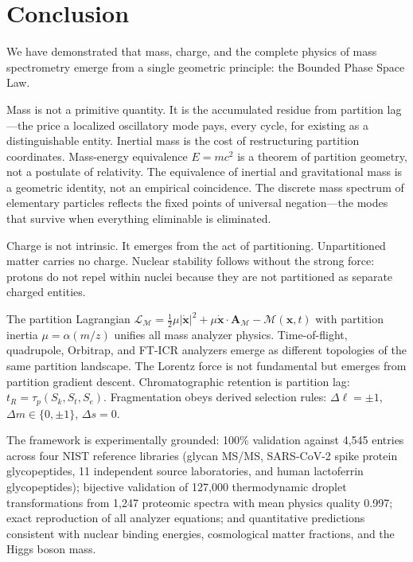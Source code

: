 \documentclass[twocolumn,10pt,a4paper]{article}
\theoremstyle{definition}
\theoremstyle{remark}
\newcommand{\Depth}{\mathcal{M}}
\newcommand{\Lagr}{\mathcal{L}}
\newcommand{\Apartition}{\mathbf{A}_{\mathcal{M}}}
\newcommand{\partinert}{\mu}
\newcommand{\taup}{\tau_p}
\begin{document}
\section{Conclusion}
\label{sec:conclusion}

We have demonstrated that mass, charge, and the complete physics of mass spectrometry emerge from a single geometric principle: the Bounded Phase Space Law.

Mass is not a primitive quantity. It is the accumulated residue from partition lag---the price a localized oscillatory mode pays, every cycle, for existing as a distinguishable entity. Inertial mass is the cost of restructuring partition coordinates. Mass-energy equivalence $E = mc^2$ is a theorem of partition geometry, not a postulate of relativity. The equivalence of inertial and gravitational mass is a geometric identity, not an empirical coincidence. The discrete mass spectrum of elementary particles reflects the fixed points of universal negation---the modes that survive when everything eliminable is eliminated.

Charge is not intrinsic. It emerges from the act of partitioning. Unpartitioned matter carries no charge. Nuclear stability follows without the strong force: protons do not repel within nuclei because they are not partitioned as separate charged entities.

The partition Lagrangian $\Lagr_{\Depth} = \frac{1}{2}\partinert|\dot{\mathbf{x}}|^2 + \partinert\dot{\mathbf{x}}\cdot\Apartition - \Depth(\mathbf{x}, t)$ with partition inertia $\partinert = \alpha(m/z)$ unifies all mass analyzer physics. Time-of-flight, quadrupole, Orbitrap, and FT-ICR analyzers emerge as different topologies of the same partition landscape. The Lorentz force is not fundamental but emerges from partition gradient descent. Chromatographic retention is partition lag: $t_R = \taup(S_k, S_t, S_e)$. Fragmentation obeys derived selection rules: $\Delta\ell = \pm 1$, $\Delta m \in \{0, \pm 1\}$, $\Delta s = 0$.

The framework is experimentally grounded: 100\% validation against 4,545 entries across four NIST reference libraries (glycan MS/MS, SARS-CoV-2 spike protein glycopeptides, 11 independent source laboratories, and human lactoferrin glycopeptides); bijective validation of 127,000 thermodynamic droplet transformations from 1,247 proteomic spectra with mean physics quality 0.997; exact reproduction of all analyzer equations; and quantitative predictions consistent with nuclear binding energies, cosmological matter fractions, and the Higgs boson mass.
\end{document}
